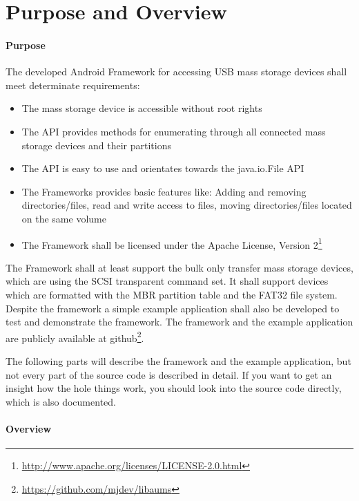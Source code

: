 \chapter{Purpose and Overview}

\subsubsection{Purpose}
\label{implementation_purpose}

The developed Android Framework for accessing USB mass storage devices shall meet determinate requirements:

\begin{itemize}
\item The mass storage device is accessible without root rights
\item The API provides methods for enumerating through all connected mass storage devices and their partitions
\item The API is easy to use and orientates towards the java.io.File API
\item The Frameworks provides basic features like: Adding and removing directories/files, read and write access to files, moving directories/files located on the same volume
\item The Framework shall be licensed under the Apache License, Version 2\footnote{\url{http://www.apache.org/licenses/LICENSE-2.0.html}}
\end{itemize}

The Framework shall at least support the bulk only transfer mass storage devices, which are using the SCSI transparent command set. It shall support devices which are formatted with the MBR partition table and the FAT32 file system. Despite the framework a simple example application shall also be developed to test and demonstrate the framework. The framework and the example application are publicly available at github\footnote{\url{https://github.com/mjdev/libaums}}.

The following parts will describe the framework and the example application, but not every part of the source code is described in detail. If you want to get an insight how the hole things work, you should look into the source code directly, which is also documented.

\subsubsection{Overview}
\label{implementation_overview}

